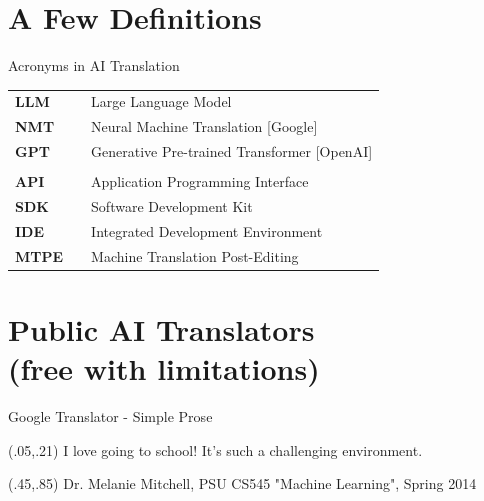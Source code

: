 \documentclass{beamer}
\begin{document}
\section{A Few Definitions}

\begin{frame} {Acronyms in AI Translation}
 \begin{table}
\begin{tabular}{lll}
\textbf{LLM}  &   &    Large Language Model\\
\textbf{NMT}  &   &    Neural Machine Translation [Google] \\
\textbf{GPT } &   &    Generative Pre-trained Transformer	[OpenAI]\\
     &   & \\
\textbf{API}  &   &    Application Programming Interface\\
\textbf{SDK} &    &    Software Development Kit\\
\textbf{IDE } &   &    Integrated Development Environment\\
\textbf{MTPE} &  & Machine Translation Post-Editing\\
\end{tabular}
\end{table}

\end{frame}

\section{Public AI Translators\\
(free with limitations)}

\begin{frame}{Google Translator - Simple Prose}

\begin{textblock}{1}(.05,.21)
  \normalsize {I love going to school! It's such a challenging environment.}
\end{textblock}\begin{textblock}{1}(.45,.85)
  \tiny{Dr. Melanie Mitchell, PSU CS545 "Machine Learning", Spring 2014}
\end{textblock}


\end{frame}
\end{document}
